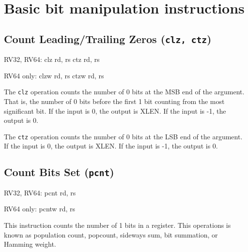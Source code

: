 \section{Basic bit manipulation instructions}


\subsection{Count Leading/Trailing Zeros (\texttt{clz, ctz})}

\begin{rvb}
  RV32, RV64:
    clz rd, rs
    ctz rd, rs

  RV64 only:
    clzw rd, rs
    ctzw rd, rs
\end{rvb}

The {\tt clz} operation counts the number of 0 bits at the MSB end of the
argument.  That is, the number of 0 bits before the first 1 bit counting from
the most significant bit. If the input is 0, the output is XLEN. If the input
is -1, the output is 0.

The {\tt ctz} operation counts the number of 0 bits at the LSB end of the
argument. If the input is 0, the output is XLEN. If the input is -1, the
output is 0.



%
%


\subsection{Count Bits Set (\texttt{pcnt})}

\begin{rvb}
  RV32, RV64:
    pcnt rd, rs

  RV64 only:
    pcntw rd, rs
\end{rvb}

This instruction counts the number of 1 bits in a register. This operations is known as
population count, popcount, sideways sum, bit summation, or Hamming weight.~\cite{HammingWeight,Warren12}

